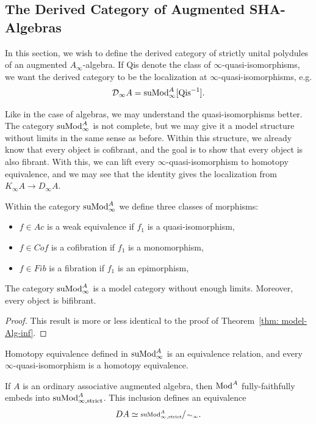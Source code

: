 \documentclass[../thesis.tex]{subfiles}
\begin{document}
        \subsection{The Derived Category of Augmented SHA-Algebras} 

            In this section, we wish to define the derived category of strictly unital polydules of an augmented $A_\infty$-algebra. If Qis denote the class of $\infty$-quasi-isomorphisms, we want the derived category to be the localization at $\infty$-quasi-isomorphisms, e.g.
            \begin{align*}
                \mathcal{D}_\infty A = \tt{suMod}_\infty^A[\tt{Qis}^{-1}].
            \end{align*}

            Like in the case of algebras, we may understand the quasi-isomorphisms better. The category $\tt{suMod}_\infty^A$ is not complete, but we may give it a model structure without limits in the same sense as before. Within this structure, we already know that every object is cofibrant, and the goal is to show that every object is also fibrant. With this, we can lift every $\infty$-quasi-isomorphism to homotopy equivalence, and we may see that the identity gives the localization from $K_\infty A \to D_\infty A$.

            Within the category $\tt{suMod}_\infty^A$ we define three classes of morphisms:
            \begin{itemize}
                \item $f\in Ac$ is a weak equivalence if $f_1$ is a quasi-isomorphism,
                \item $f\in Cof$ is a cofibration if $f_1$ is a monomorphism,
                \item $f\in Fib$ is a fibration if $f_1$ is an epimorphism,
            \end{itemize}

            \begin{thm}
                The category $\tt{suMod}_\infty^A$ is a model category without enough limits. Moreover, every object is bifibrant.
            \end{thm}

            \begin{proof}
                This result is more or less identical to the proof of Theorem~\ref{thm: model-Alg-inf}.
            \end{proof}

            \begin{corollary}
                Homotopy equivalence defined in $\tt{suMod}_\infty^A$ is an equivalence relation, and every $\infty$-quasi-isomorphism is a homotopy equivalence.

                If $A$ is an ordinary associative augmented algebra, then $\tt{Mod}^A$ fully-faithfully embeds into $\tt{suMod}_{\infty, \tt{strict}}^A$. This inclusion defines an equivalence
                \begin{align*}
                    DA \simeq \sfrac{\tt{suMod}^A_{\infty, \tt{strict}}}{\sim_\infty}\tt{.}
                \end{align*}
            \end{corollary}
\end{document}
